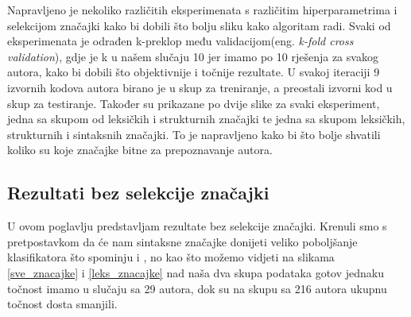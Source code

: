 Napravljeno je nekoliko različitih eksperimenata s različitim hiperparametrima i selekcijom značajki kako bi dobili što bolju sliku kako algoritam radi. Svaki od eksperimenata je odrađen k-preklop među validacijom(eng. \textit{k-fold cross validation}), gdje je k u našem slučaju 10 jer imamo po 10 rješenja za svakog autora, kako bi dobili što objektivnije i točnije rezultate. U svakoj iteraciji 9 izvornih kodova autora birano je u skup za treniranje, a preostali izvorni kod u skup za testiranje.
Također su prikazane po dvije slike za svaki eksperiment, jedna sa skupom od leksičkih i strukturnih značajki te jedna sa skupom leksičkih, strukturnih i sintaksnih značajki. To je napravljeno kako bi što bolje shvatili koliko su koje značajke bitne za prepoznavanje autora.

\subsection{Rezultati bez selekcije značajki}

U ovom poglavlju predstavljam rezultate bez selekcije značajki. Krenuli smo s pretpostavkom da će nam sintaksne značajke donijeti veliko poboljšanje klasifikatora što spominju i \cite{islam}, no kao što možemo vidjeti na slikama \ref{sve_znacajke} i \ref{leks_znacajke} nad naša dva skupa podataka gotov jednaku točnost imamo u slučaju sa 29 autora, dok su na skupu sa 216 autora ukupnu točnost dosta smanjili. 


